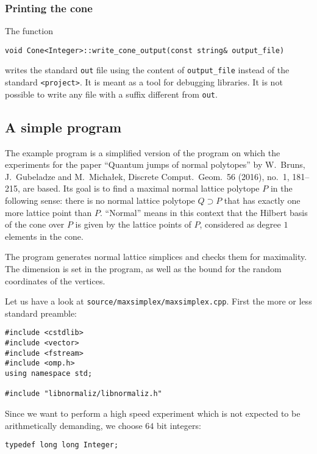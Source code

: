 \documentclass[12pt,a4paper]{scrartcl}
\theoremstyle{definition}
\begin{document}
\begin{small}
\subsubsection{Printing the cone}

The function
\begin{Verbatim}
void Cone<Integer>::write_cone_output(const string& output_file)
\end{Verbatim}

writes the standard \verb|out| file using the content of \verb|output_file| instead of the standard \verb|<project>|. It is meant as a tool for debugging libraries. It is not possible to write any file with a suffix different from \verb|out|.

\subsection{A simple program}\label{maxsimplex}

The example program is a simplified version of the program on which the experiments for the paper ``Quantum jumps of normal polytopes'' by W.~Bruns, J.~Gubeladze and M.~Micha\l{}ek, Discrete Comput.\ Geom.\ 56 (2016), no.\ 1, 181--215, are based. Its goal is to find a maximal normal lattice polytope $P$ in the following sense: there is no normal lattice polytope $Q\supset P$ that has exactly one more lattice point than $P$. ``Normal'' means in this context that the Hilbert basis of the cone over $P$ is given by the lattice points of $P$, considered as degree $1$ elements in the cone.

The program generates normal lattice simplices and checks them for maximality. The dimension is set in the program, as well as the bound for the random coordinates of the vertices.

Let us have a look at \verb|source/maxsimplex/maxsimplex.cpp|. First the more or less standard preamble:

\begin{Verbatim}
#include <cstdlib>
#include <vector>
#include <fstream>
#include <omp.h>
using namespace std;

#include "libnormaliz/libnormaliz.h"
\end{Verbatim}

Since we want to perform a high speed experiment which is not expected to be arithmetically demanding, we choose $64$ bit integers:
\begin{Verbatim}
typedef long long Integer;
\end{Verbatim}


\end{small}
\end{document}
